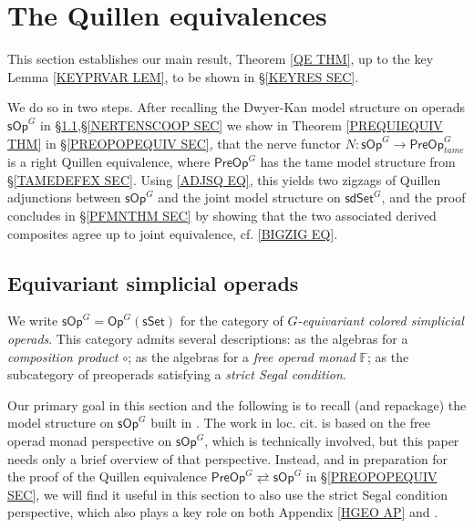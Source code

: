 \documentclass[a4paper,10pt
,draft
]{article}%
\numberwithin{equation}{section}
\numberwithin{figure}{section}
\theoremstyle{definition} %
\newcommand{\sOp}{\ensuremath{\mathsf{sOp}}}%
\newcommand{\sdSet}{\mathsf{sdSet}}
\newcommand{\PreOp}{\mathsf{PreOp}}
\newcommand{\1}{\ensuremath{\mathbbm 1}}%
\begin{document}
\section{The Quillen equivalences}\label{QE_SEC}


This section establishes our main result, Theorem \ref{QE THM},
up to the key Lemma \ref{KEYPRVAR LEM}, 
to be shown in \S \ref{KEYRES SEC}.


We do so in two steps.
After recalling the Dwyer-Kan model structure on operads $\mathsf{sOp}^G$ in \S \ref{GSOP_SEC},\S \ref{NERTENSCOOP SEC}
we show in Theorem \ref{PREQUIEQUIV THM} in \S \ref{PREOPOPEQUIV SEC},
that the nerve functor
$N \colon \mathsf{sOp}^G
 \to 
\PreOp^G_{tame}$
is a right Quillen equivalence,
where $\PreOp^G$
has the tame model structure from \S \ref{TAMEDEFEX SEC}.
Using \eqref{ADJSQ EQ},
this yields two zigzags of Quillen adjunctions between $\sOp^G$ and the joint model structure on $\sdSet^G$,
and the proof concludes in \S \ref{PFMNTHM SEC}
by showing that the two associated derived composites agree up to joint equivalence,
cf. \eqref{BIGZIG EQ}.




\subsection{Equivariant simplicial operads}
\label{GSOP_SEC}

We write $\mathsf{sOp}^G = \mathsf{Op}^{G}(\mathsf{sSet})$
for the 
category of \textit{$G$-equivariant colored simplicial operads}.
This category admits several descriptions:
as the algebras for a \emph{composition product $\circ$};
as the algebras for a \emph{free operad monad} $\mathbb{F}$;
as the subcategory of preoperads satisfying a \emph{strict Segal condition}.

Our primary goal in this section and the following is to recall (and repackage) the model structure on $\mathsf{sOp}^G$ built in 
\cite[Thm. \ref{AC-THMA}]{BP_ACOP}.
The work in loc. cit. is based on the free operad monad perspective on 
$\mathsf{sOp}^G$, which is technically involved,
but this paper needs only a brief overview of that perspective.
%
Instead, and in preparation for the proof of the Quillen equivalence
$\mathsf{PreOp}^G \rightleftarrows \mathsf{sOp}^G$
in \S \ref{PREOPOPEQUIV SEC},
we will find it useful in this section to also use the 
strict Segal condition perspective,
which also plays a key role on both 
{\color{red} Appendix \ref{HGEO AP} and \cite{BP_WCONS}}.
\end{document}
